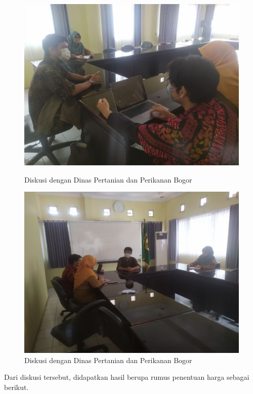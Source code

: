 \begin{spacing}{1.5}
\begin{figure}[H]
	\hspace{.05\linewidth}
		\includegraphics[width=1.5\linewidth]{gambar/disk1.jpg}
		\caption{Diskusi dengan Dinas Pertanian dan Perikanan Bogor}
	\endminipage
	\hspace{.18\linewidth}
		\includegraphics[width=1.5\linewidth]{gambar/disk2.jpg}
		\caption{Diskusi dengan Dinas Pertanian dan Perikanan Bogor}
	\endminipage
	\hspace{.05\linewidth}
\end{figure}


Dari diskusi tersebut, didapatkan hasil berupa rumus penentuan harga sebagai berikut.


\end{spacing}
